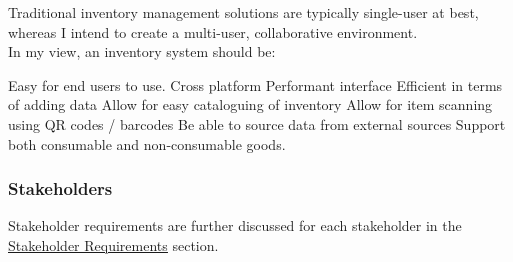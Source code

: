 \documentclass{article}
\begin{document}
\noindent Traditional inventory management solutions are typically single-user at best, whereas I intend to create
a multi-user, collaborative environment.\\

\noindent In my view, an inventory system should be:

\begin{outline}
    \1 Easy for end users to use.
    \1 Cross platform
    \1 Performant interface
    \1 Efficient in terms of adding data
    \1 Allow for easy cataloguing of inventory
    \1 Allow for item scanning using QR codes / barcodes
    \1 Be able to source data from external sources
    \1 Support both consumable and non-consumable goods.


\end{outline}

\subsubsection{Stakeholders}

Stakeholder requirements are further discussed for each stakeholder in the \underline{\hyperref[sec:stakeholderRequirements]{Stakeholder Requirements}} section.\\

\newcommand{\stakeholderEntry}[4]{{#1} & {#2} & {#3} & {#4}\\\hline}
\end{document}
